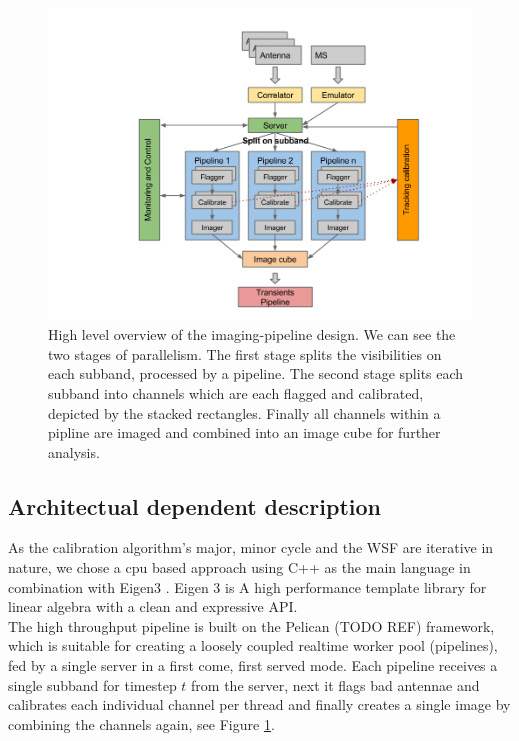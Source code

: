 \documentclass{aa}
\begin{document}
\begin{figure}[tbh]
\includegraphics[width=1\columnwidth]{Figs/pipeline-design}\caption{\label{fig:pipeline}
High level overview of the imaging-pipeline design. We can see the two stages
of parallelism. The first stage splits the visibilities on each subband,
processed by a pipeline.  The second stage splits each subband into channels
which are each flagged and calibrated, depicted by the stacked rectangles.
Finally all channels within a pipline are imaged and combined into an image
cube for further analysis.}
\end{figure}

\subsection{Architectual dependent description}
As the calibration algorithm's major, minor cycle and the WSF are iterative in
nature, we chose a cpu based approach using C++ as the main language in
combination with Eigen3 \citep{eigenweb}. Eigen 3 is A high performance
template library for linear algebra with a clean and expressive API. \\
The high throughput pipeline is built on the Pelican (TODO REF)
framework, which is suitable for creating a loosely coupled realtime worker
pool (pipelines), fed by a single server in a first come, first served mode.
Each pipeline receives a single subband for timestep $t$ from the server, next
it flags bad antennae and calibrates each individual channel per thread and
finally creates a single image by combining the channels again, see Figure
\ref{fig:pipeline}.
\end{document}
